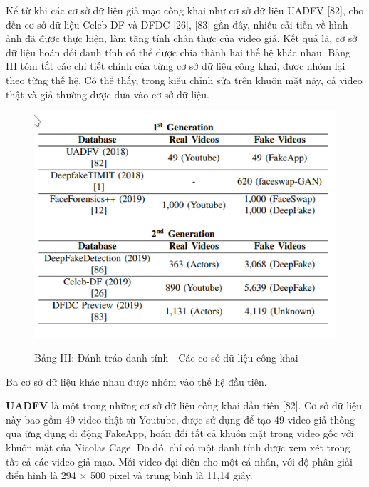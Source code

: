 \documentclass{article}
\begin{document}
Kể từ khi các cơ sở dữ liệu giả mạo công khai như cơ sở dữ liệu UADFV [82], cho đến cơ sở dữ liệu Celeb-DF và DFDC [26], [83] gần đây, nhiều cải tiến về hình ảnh đã được thực hiện, làm tăng tính chân thực của video giả. Kết quả là, cơ sở dữ liệu hoán đổi danh tính có thể được chia thành hai thế hệ khác nhau. Bảng III tóm tắt các chi tiết chính của từng cơ sở dữ liệu công khai, được nhóm lại theo từng thế hệ. Có thể thấy, trong kiểu chỉnh sửa trên khuôn mặt này, cả video thật và giả thường được đưa vào cơ sở dữ liệu.

\begin{figure}[h!]
\caption{Bảng III: Đánh tráo danh tính - Các cơ sở dữ liệu công khai}
\includegraphics[width=\columnwidth]{table-3-database}
\label{table-3-database}
\end{figure}

Ba cơ sở dữ liệu khác nhau được nhóm vào thế hệ đầu tiên.

\textbf{UADFV} là một trong những cơ sở dữ liệu công khai đầu tiên [82]. Cơ sở dữ liệu này bao gồm 49 video thật từ Youtube, được sử dụng để tạo 49 video giả thông qua ứng dụng di động FakeApp, hoán đổi tất cả khuôn mặt trong video gốc với khuôn mặt của Nicolas Cage. Do đó, chỉ có một danh tính được xem xét trong tất cả các video giả mạo. Mỗi video đại diện cho một cá nhân, với độ phân giải điển hình là 294 × 500 pixel và trung bình là 11,14 giây.
\end{document}
